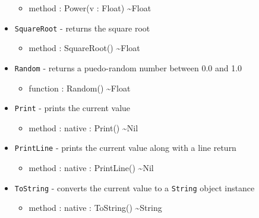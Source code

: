 \documentclass[11pt]{article}
\begin{document}
\begin{itemize}
  \begin{itemize}
  \item method : Power(v : Float) \textasciitilde Float
  \end{itemize}
\item \texttt{SquareRoot} - returns the square root
  \begin{itemize}
  \item method : SquareRoot() \textasciitilde Float
  \end{itemize}
\item \texttt{Random} - returns a puedo-random number between 0.0 and
  1.0
  \begin{itemize}
  \item function : Random() \textasciitilde Float
  \end{itemize}
\item \texttt{Print} - prints the current value
  \begin{itemize}
  \item method : native : Print() \textasciitilde Nil
  \end{itemize}
\item \texttt{PrintLine} - prints the current value along with a line
  return
  \begin{itemize}
  \item method : native : PrintLine() \textasciitilde Nil
  \end{itemize}
\item \texttt{ToString} - converts the current value to a
  \texttt{String} object instance
  \begin{itemize}
  \item method : native : ToString() \textasciitilde String
  \end{itemize}
\end{itemize}
\end{document}
